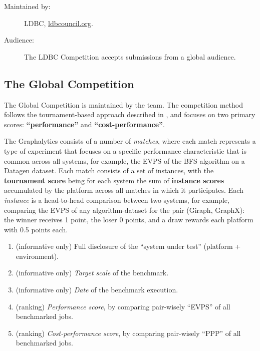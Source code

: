 \begin{description}
    \item[Maintained by:] LDBC, \url{ldbcouncil.org}.
    \item[Audience:] The LDBC Competition accepts submissions from a global audience.
\end{description} 




\subsection{The Global \toolname{} Competition} \label{sec:competitions:graphalytics}
The Global \toolname{} Competition is maintained by the \toolname team. The competition method follows the tournament-based approach described in , and focuses on two primary scores: {\bf ``performance''} and {\bf ``cost-performance''}.

The Graphalytics consists of a number of {\it matches}, where each match represents a type of experiment that focuses on a specific performance characteristic that is common across all systems, for example, the EVPS of the BFS algorithm on a Datagen dataset. Each match consists of a set of instances, with the {\bf tournament score} being for each system the sum of {\bf instance scores} accumulated by the platform across all matches in which it participates.  Each {\it instance} is a head-to-head comparison between two systems, for example, comparing the EVPS of any algorithm-dataset for the pair (Giraph, GraphX): the winner receives 1 point, the loser 0 points, and a draw rewards each platform with 0.5 points each.


\begin{enumerate}
    \item (informative only) Full disclosure of the ``system under test'' (platform + environment).
    \item (informative only) {\it Target scale} of the benchmark.
    \item (informative only) {\it Date} of the benchmark execution.
	\item (ranking) {\it Performance score}, by comparing pair-wisely ``EVPS'' of all benchmarked jobs.
	\item (ranking) {\it Cost-performance score}, by comparing pair-wisely  ``PPP'' of all benchmarked jobs.
\end{enumerate}



